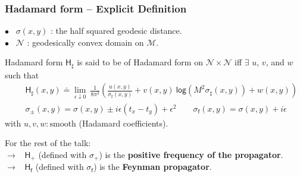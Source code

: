 \documentclass[9pt]{beamer}
\renewcommand{\log}{\mathsf{log}}
\newcommand{\Mcal}{\mathcal{M}}
\newcommand{\Ncal}{\mathcal{N}}
\newcommand{\Hsf}{\mathsf{H}}
\newcommand{\fsf}{\mathsf{f}}
\begin{document}
\begin{frame}

\frametitle{Hadamard form -- Explicit Definition}

\vfill

$\bullet$ \ $\sigma(x,y)$ : the half squared geodesic distance. \\[2pt]

$\bullet$ \ $\Ncal$ : geodesically convex domain on $\Mcal$.

\vfill

\begin{block}{Hadamard form}
$\Hsf_\sharp$ is said to be of Hadamard form on $\Ncal \times \Ncal$ iff $\exists$ $u$, $v$, and $w$ such that
\begin{eqnarray*}
&& \Hsf_\sharp(x,y) \doteq \lim_{\epsilon \downarrow 0} \ \frac{1}{8\pi^2}\left(\frac{u(x,y)}{\sigma_\sharp(x,y)}+v(x,y) \ \log(M^2 \sigma_\sharp(x,y))+w(x,y)\right)  \\[4pt]
&& \sigma_\pm(x,y) = \sigma(x,y) \pm i\epsilon(t_x-t_y) + \epsilon^2 \qquad \sigma_\fsf(x,y) = \sigma(x,y) + i\epsilon 
\end{eqnarray*}
with $u,v,w:  \mbox{smooth}$ (Hadamard coefficients).
\end{block}

For the rest of the talk: \\[2pt]
\qquad $\to$ \ $\Hsf_+$ (defined with $\sigma_+$) is the \textbf{positive frequency of the propagator}. \\
\qquad $\to$ \ $\Hsf_\fsf$ (defined with $\sigma_\fsf$) is the \textbf{Feynman propagator}.

\end{frame} 

\end{document}
